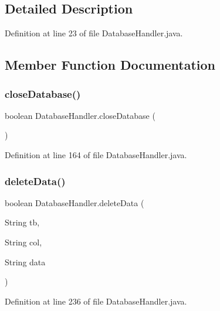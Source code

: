 \subsection{Detailed Description}


Definition at line 23 of file Database\+Handler.\+java.



\subsection{Member Function Documentation}
\mbox{\label{class_database_handler_a4ae94f3d0326a638af3ff4fb4a90e976}} 
\subsubsection{\texorpdfstring{closeDatabase()}{closeDatabase()}}
{\footnotesize\ttfamily boolean Database\+Handler.\+close\+Database (\begin{DoxyParamCaption}{ }\end{DoxyParamCaption})}



Definition at line 164 of file Database\+Handler.\+java.

\mbox{\label{class_database_handler_ab63bedcd19c5e1596c6e693672cc479a}} 
\subsubsection{\texorpdfstring{deleteData()}{deleteData()}}
{\footnotesize\ttfamily boolean Database\+Handler.\+delete\+Data (\begin{DoxyParamCaption}\item[{String}]{tb,  }\item[{String}]{col,  }\item[{String}]{data }\end{DoxyParamCaption})}



Definition at line 236 of file Database\+Handler.\+java.

\mbox{\label{class_database_handler_a12c440f6f040a17f9f651ce9edc5d608}} 
